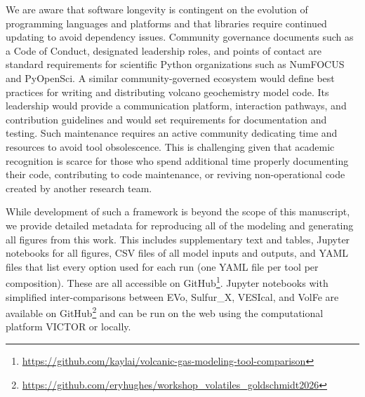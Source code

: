 \documentclass[draft, english]{volcanica-template}
\begin{document}
We are aware that software longevity is contingent on the evolution of programming languages and platforms and that libraries require continued updating to avoid dependency issues. Community governance documents such as a Code of Conduct, designated leadership roles, and points of contact are standard requirements for scientific Python organizations such as NumFOCUS and PyOpenSci. A similar community-governed ecosystem would define best practices for writing and distributing volcano geochemistry model code. Its leadership would provide a communication platform, interaction pathways, and contribution guidelines and would set requirements for documentation and testing. Such maintenance requires an active community dedicating time and resources to avoid tool obsolescence. This is challenging given that academic recognition is scarce for those who spend additional time properly documenting their code, contributing to code maintenance, or reviving non-operational code created by another research team.

While development of such a framework is beyond the scope of this manuscript, we provide detailed metadata for reproducing all of the modeling and generating all figures from this work. This includes supplementary text and tables, Jupyter notebooks for all figures, CSV files of all model inputs and outputs, and YAML files that list every option used for each run (one YAML file per tool per composition). These are all accessible on GitHub\footnote{\url{https://github.com/kaylai/volcanic-gas-modeling-tool-comparison}}. Jupyter notebooks with simplified inter-comparisons between EVo, Sulfur\_X, VESIcal, and VolFe are available on GitHub\footnote{\url{https://github.com/eryhughes/workshop_volatiles_goldschmidt2026}} and can be run on the web using the computational platform VICTOR \parencite{lev2025victor} or locally. 
\end{document}
